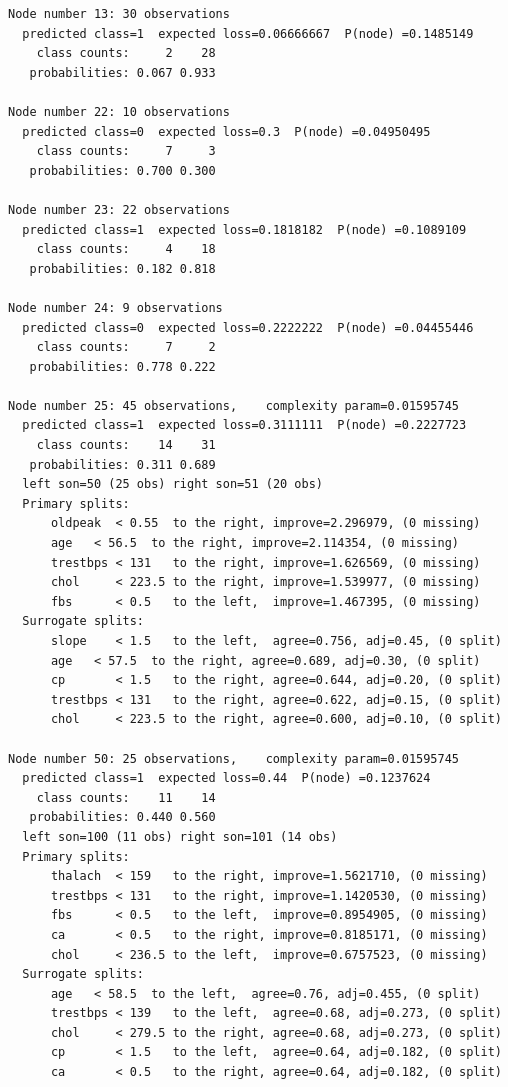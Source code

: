 \documentclass{article}
\begin{document}
\begin{lstlisting}
Node number 13: 30 observations
  predicted class=1  expected loss=0.06666667  P(node) =0.1485149
    class counts:     2    28
   probabilities: 0.067 0.933 

Node number 22: 10 observations
  predicted class=0  expected loss=0.3  P(node) =0.04950495
    class counts:     7     3
   probabilities: 0.700 0.300 

Node number 23: 22 observations
  predicted class=1  expected loss=0.1818182  P(node) =0.1089109
    class counts:     4    18
   probabilities: 0.182 0.818 

Node number 24: 9 observations
  predicted class=0  expected loss=0.2222222  P(node) =0.04455446
    class counts:     7     2
   probabilities: 0.778 0.222 

Node number 25: 45 observations,    complexity param=0.01595745
  predicted class=1  expected loss=0.3111111  P(node) =0.2227723
    class counts:    14    31
   probabilities: 0.311 0.689 
  left son=50 (25 obs) right son=51 (20 obs)
  Primary splits:
      oldpeak  < 0.55  to the right, improve=2.296979, (0 missing)
      age   < 56.5  to the right, improve=2.114354, (0 missing)
      trestbps < 131   to the right, improve=1.626569, (0 missing)
      chol     < 223.5 to the right, improve=1.539977, (0 missing)
      fbs      < 0.5   to the left,  improve=1.467395, (0 missing)
  Surrogate splits:
      slope    < 1.5   to the left,  agree=0.756, adj=0.45, (0 split)
      age   < 57.5  to the right, agree=0.689, adj=0.30, (0 split)
      cp       < 1.5   to the right, agree=0.644, adj=0.20, (0 split)
      trestbps < 131   to the right, agree=0.622, adj=0.15, (0 split)
      chol     < 223.5 to the right, agree=0.600, adj=0.10, (0 split)

Node number 50: 25 observations,    complexity param=0.01595745
  predicted class=1  expected loss=0.44  P(node) =0.1237624
    class counts:    11    14
   probabilities: 0.440 0.560 
  left son=100 (11 obs) right son=101 (14 obs)
  Primary splits:
      thalach  < 159   to the right, improve=1.5621710, (0 missing)
      trestbps < 131   to the right, improve=1.1420530, (0 missing)
      fbs      < 0.5   to the left,  improve=0.8954905, (0 missing)
      ca       < 0.5   to the right, improve=0.8185171, (0 missing)
      chol     < 236.5 to the left,  improve=0.6757523, (0 missing)
  Surrogate splits:
      age   < 58.5  to the left,  agree=0.76, adj=0.455, (0 split)
      trestbps < 139   to the left,  agree=0.68, adj=0.273, (0 split)
      chol     < 279.5 to the right, agree=0.68, adj=0.273, (0 split)
      cp       < 1.5   to the left,  agree=0.64, adj=0.182, (0 split)
      ca       < 0.5   to the right, agree=0.64, adj=0.182, (0 split)


\end{lstlisting}
\end{document}
